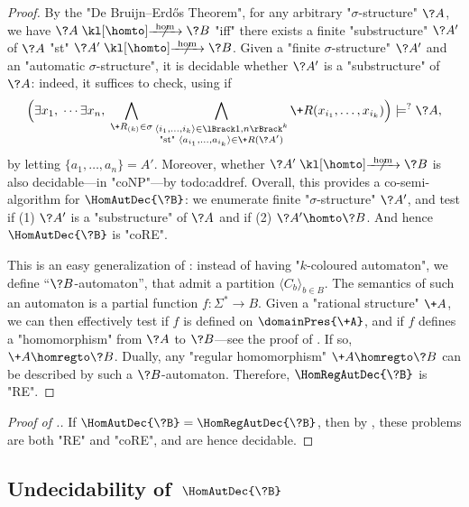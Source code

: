 \begin{proof}
	By the "De Bruijn–Erdős Theorem", for any arbitrary "$\sigma$-structure" $\?A$,
	we have $\?A \nothomto \?B$ "iff" there exists a finite "substructure" $\?A'$ of $\?A$
	"st" $\?A' \nothomto \?B$.
	Given a "finite $\sigma$-structure" $\?A'$ and an "automatic $\sigma$-structure",
	it is decidable whether $\?A'$ is a "substructure" of $\?A$: indeed, it suffices
	to check, using  if
	\[
		\Bigl(
			\exists x_1,\; \cdots \exists x_n,\;
			\bigwedge_{\+R_{(k)} \in \sigma} \bigwedge_{\substack{\tup{i_1,\hdots,i_k} \in \lBrack 1,n\rBrack^k\\\text{"st" }\tup{a_{i_1},\hdots,a_{i_k}} \in \+R(\?A')}}
			\+R(x_{i_1},\hdots,x_{i_k})
		\Bigr)
		\models^{?} \?A,
	\]
	by letting $\{a_1,\hdots,a_n\} = A'$. 
	Moreover, whether $\?A' \nothomto \?B$ is also decidable---in "coNP"---by todo:addref.
	Overall, this provides a co-semi-algorithm for $\HomAutDec{\?B}$: we enumerate finite
	"$\sigma$-structure" $\?A'$, and test if (1) $\?A'$ is a "substructure" of $\?A$ and if (2)
	$\?A' \homto \?B$. And hence $\HomAutDec{\?B}$ is "coRE".

	 This is an easy generalization of
	: instead of having "$k$-coloured automaton", we define
	``$\?B$-automaton'', that admit a partition $\langle C_{b} \rangle_{b \in B}$.
	The semantics of such an automaton is a partial function $f\colon \Sigma^* \to B$. 
	Given a "rational structure" $\+A$, we can then effectively test if $f$ is defined on $\domainPres{\+A}$, and if $f$ defines a "homomorphism" from $\?A$ to $\?B$---see
	the proof of . If so, $\+A \homregto \?B$. Dually, any "regular homomorphism" $\+A \homregto \?B$ can be described by such a $\?B$-automaton.
	Therefore, $\HomRegAutDec{\?B}$ is "RE".
\end{proof}

\begin{proof}[Proof of .]
	If $\HomAutDec{\?B} = \HomRegAutDec{\?B}$, then by ,
	these problems are both "RE" and "coRE", and are hence decidable.
\end{proof}

\subsection{Undecidability of \,$\HomAutDec{\?B}$}
\AP\label{sec:undecidability-hom}

